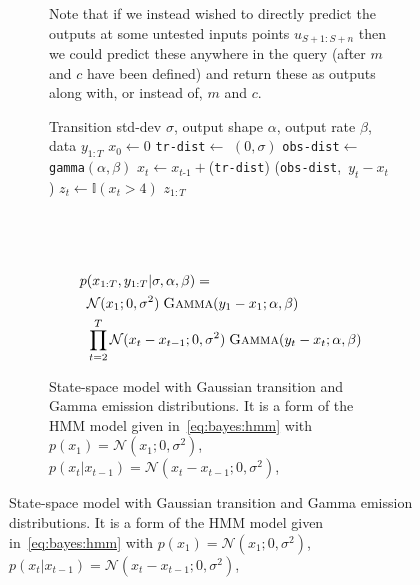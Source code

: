 \begin{figure}[p]
\begin{subfigure}[t]{\textwidth}
{%
		  Note that if we instead
		  wished to directly predict the outputs at some untested inputs points $u_{S+1:S+n}$ then we could
		  predict these anywhere in the query (after $m$ and $c$ have been defined) and return these
		  as outputs along with, or instead of, $m$ and $c$.
		  \label{fig:probprog:linear-reg}
		  }
	\end{subfigure}
		\begin{subfigure}[t]{\textwidth}
			\vspace{10pt}
\centering	
\begin{minipage}[t]{0.45\textwidth}
	\begin{algorithmic}[1]
		\renewcommand{\algorithmicrequire}{\textbf{Inputs:}}
		\renewcommand{\algorithmicensure}{\textbf{Outputs:}}			 
		\Require Transition std-dev $\sigma$, output shape $\alpha$,
		output rate $\beta$, data $y_{1:T}$
		\State $x_0\leftarrow0$
		\State \lstinline$tr-dist$\xspace $\leftarrow$ \normal $(0,\sigma)$
		\State \lstinline$obs-dist$\xspace $\leftarrow$ \lstinline$gamma$\xspace $(\alpha,\beta)$
		\State $x_t \leftarrow x_{t\text{-}1}+$\sample(\lstinline$tr-dist$\xspace)
		\State \observe(\lstinline$obs-dist$\xspace,~$y_t-x_t$)
		\State $z_t \leftarrow \mathbb{I}(x_t>4)$
		\EndFor
		\State \Return $z_{1:T}$
	\end{algorithmic}
\end{minipage}
~~
\begin{minipage}[t]{0.52\textwidth}
	\vspace{-6pt}
	~~~\resizebox{0.96\textwidth}{!}{
		}
	{\small
	\begin{align*}
	p&(x_{1:T}, y_{1:T} | \sigma,\alpha,\beta)= \\
	&\mathcal{N}(x_1;0,\sigma^2) \; \textsc{Gamma}(y_1-x_1;\alpha,\beta)\\
	&\prod_{t=2}^{T} \mathcal{N}(x_t-x_{t-1};0,\sigma^2) \; \textsc{Gamma} (y_t-x_t;\alpha,\beta)
	\end{align*}}
\end{minipage}
			\caption{State-space model with Gaussian transition and Gamma emission distributions.
				It is a form of the HMM model given in~\eqref{eq:bayes:hmm} with
				$p(x_1)=\mathcal{N}(x_1;0,\sigma^2)$, $p(x_t | x_{t-1}) = \mathcal{N}(x_t-x_{t-1}; 0,\sigma^2)$,
}
\end{subfigure}
\end{figure}
